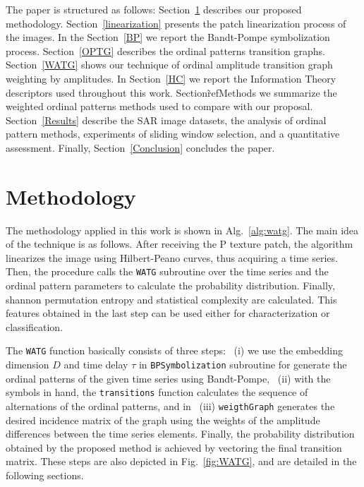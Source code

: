 \documentclass[journal]{IEEEtran}
\begin{document}
The paper is structured as follows:
Section~\ref{methodology} describes our proposed methodology.
Section~\ref{linearization} presents the patch linearization process of the images.
In the Section~\ref{BP} we report the Bandt-Pompe symbolization process.
Section~\ref{OPTG} describes the ordinal patterns transition graphs.
Section~\ref{WATG} shows our technique of ordinal amplitude transition graph weighting by amplitudes.
In Section~\ref{HC} we report the Information Theory descriptors used throughout this work.
Section\~ref{Methods} we summarize the weighted ordinal patterns methods used to compare with our proposal.
Section~\ref{Results} describe the SAR image datasets, 
the analysis of ordinal pattern methods, 
experiments of sliding window selection, 
and a quantitative assessment.
Finally, Section~\ref{Conclusion} concludes the paper.

\section{Methodology}\label{methodology}

The methodology applied in this work is shown in Alg.~\ref{alg:watg}.
The main idea of the technique is as follows.
After receiving the P texture patch, the algorithm linearizes the image using Hilbert-Peano curves, thus acquiring a time series.
Then, the procedure calls the \texttt{WATG} subroutine over the time series and the ordinal pattern parameters to calculate the probability distribution.
Finally, shannon permutation entropy and statistical complexity are calculated.
This features obtained in the last step can be used either for characterization or classification.

The \texttt{WATG} function basically consists of three steps: ~(i) we use the embedding dimension $D$ and time delay $\tau$ in \texttt{BPSymbolization} subroutine for generate the ordinal patterns of the given time series using Bandt-Pompe, ~(ii) with the symbols in hand, the \texttt{transitions} function calculates the sequence of alternations of the ordinal patterns, and in ~(iii) \texttt{weigthGraph} generates the desired incidence matrix of the graph using the weights of the amplitude differences between the time series elements.
Finally, the probability distribution obtained by the proposed method is achieved by vectoring the final transition matrix.
These steps are also depicted in Fig.~\ref{fig:WATG}, and are detailed in the following sections.
\end{document}
